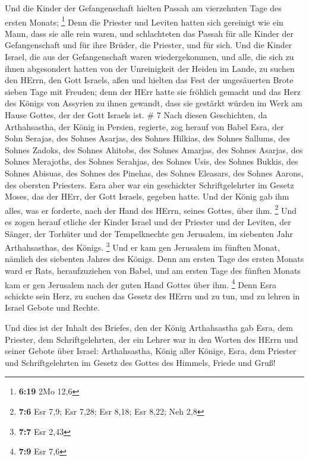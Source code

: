  Und die Kinder der Gefangenschaft hielten Passah am
vierzehnten Tage des ersten Monats; \footnote{\textbf{6:19} 2Mo 12,6}
 Denn die Priester und Leviten hatten sich gereinigt wie
ein Mann, dass sie alle rein waren, und schlachteten das Passah für alle
Kinder der Gefangenschaft und für ihre Brüder, die Priester, und für
sich.  Und die Kinder Israel, die aus der Gefangenschaft
waren wiedergekommen, und alle, die sich zu ihnen abgesondert hatten von
der Unreinigkeit der Heiden im Lande, zu suchen den HErrn, den Gott
Israels, aßen  und hielten das Fest der ungesäuerten Brote
sieben Tage mit Freuden; denn der HErr hatte sie fröhlich gemacht und
das Herz des Königs von Assyrien zu ihnen gewandt, dass sie gestärkt
würden im Werk am Hause Gottes, der der Gott Israels ist. \# 7
 Nach diesen Geschichten, da Arthahsastha, der König in
Persien, regierte, zog herauf von Babel Esra, der Sohn Serajas, des
Sohnes Asarjas, des Sohnes Hilkias,  des Sohnes Sallums, des
Sohnes Zadoks, des Sohnes Ahitobs,  des Sohnes Amarjas, des
Sohnes Asarjas, des Sohnes Merajoths,  des Sohnes Serahjas,
des Sohnes Usis, des Sohnes Bukkis,  des Sohnes Abisuas, des
Sohnes des Pinehas, des Sohnes Eleasars, des Sohnes Aarons, des obersten
Priesters.  Esra aber war ein geschickter Schriftgelehrter
im Gesetz Moses, das der HErr, der Gott Israels, gegeben hatte. Und der
König gab ihm alles, was er forderte, nach der Hand des HErrn, seines
Gottes, über ihm. \footnote{\textbf{7:6} Esr 7,9; Esr 7,28; Esr 8,18;
  Esr 8,22; Neh 2,8}  Und es zogen herauf etliche der Kinder
Israel und der Priester und der Leviten, der Sänger, der Torhüter und
der Tempelknechte gen Jerusalem, im siebenten Jahr Arthahsasthas, des
Königs. \footnote{\textbf{7:7} Esr 2,43}  Und er kam gen
Jerusalem im fünften Monat, nämlich des siebenten Jahres des Königs.
 Denn am ersten Tage des ersten Monats ward er Rats,
heraufzuziehen von Babel, und am ersten Tage des fünften Monats kam er
gen Jerusalem nach der guten Hand Gottes über ihm. \footnote{\textbf{7:9}
  Esr 7,6}  Denn Esra schickte sein Herz, zu suchen das
Gesetz des HErrn und zu tun, und zu lehren in Israel Gebote und Rechte.

 Und dies ist der Inhalt des Briefes, den der König
Arthahsastha gab Esra, dem Priester, dem Schriftgelehrten, der ein
Lehrer war in den Worten des HErrn und seiner Gebote über Israel:
 Arthahsastha, König aller Könige, Esra, dem Priester und
Schriftgelehrten im Gesetz des Gottes des Himmels, Friede und Gruß!

